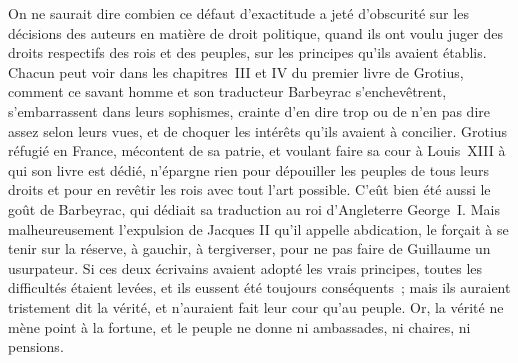 \documentclass[french,twoside]{book} %
\begin{document}
On ne saurait dire combien ce défaut d’exactitude a jeté d’obscurité sur les décisions des auteurs en matière de droit politique, quand ils ont voulu juger des droits respectifs des rois et des peuples, sur les principes qu’ils avaient établis. Chacun peut voir dans les chapitres III et IV du premier livre de Grotius, comment ce savant homme et son traducteur Barbeyrac s’enchevêtrent, s’embarrassent dans leurs sophismes, crainte d’en dire trop ou de n’en pas dire assez selon leurs vues, et de choquer les intérêts qu’ils avaient à concilier. Grotius réfugié en France, mécontent de sa patrie, et voulant faire sa cour à Louis XIII à qui son livre est dédié, n’épargne rien pour dépouiller les peuples de tous leurs droits et pour en revêtir les rois avec tout l’art possible. C’eût bien été aussi le goût de Barbeyrac, qui dédiait sa traduction au roi d’Angleterre George I. Mais malheureusement l’expulsion de Jacques II qu’il appelle abdication, le forçait à se tenir sur la réserve, à gauchir, à tergiverser, pour ne pas faire de Guillaume un usurpateur. Si ces deux écrivains avaient adopté les vrais principes, toutes les difficultés étaient levées, et ils eussent été toujours conséquents ; mais ils auraient tristement dit la vérité, et n’auraient fait leur cour qu’au peuple. Or, la vérité ne mène point à la fortune, et le peuple ne donne ni ambassades, ni chaires, ni pensions.
\end{document}
